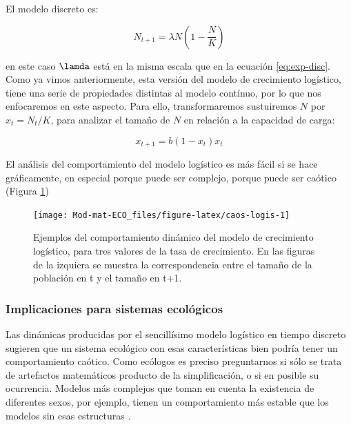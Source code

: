 \documentclass[
]{book}
\begin{document}
El modelo discreto es:

\begin{equation}
N_{t+1} = \lambda N \left (1 - \frac{N}{K} \right)
\end{equation}

en este caso \(\lamda\) está en la misma escala que en la ecuación \eqref{eq:exp-disc}. Como ya vimos anteriormente, esta versión del modelo de crecimiento logístico, tiene una serie de propiedades distintas al modelo contínuo, por lo que nos enfocaremos en este aspecto. Para ello, transformaremos sustuiremos \(N\) por \(x_t = N_t/K\), para analizar el tamaño de \(N\) en relación a la capacidad de carga:

\begin{equation}
x_{t+1} = b(1-x_t)x_t \label{eq:logis-disc}
\end{equation}

El análisis del comportamiento del modelo logístico es más fácil si se hace gráficamente, en especial porque puede ser complejo, porque puede ser caótico (Figura \ref{fig:caos-logis})

\begin{figure}

{\centering \texttt{[image: Mod-mat-ECO\_files/figure-latex/caos-logis-1]} 

}

\caption{Ejemplos del comportamiento dinámico del modelo de crecimiento logístico, para tres valores de la tasa de crecimiento. En las figuras de la izquiera se muestra la correspondencia entre el tamaño de la población en t y el tamaño en t+1.}\label{fig:caos-logis}
\end{figure}

\hypertarget{implicaciones-para-sistemas-ecoluxf3gicos}{%
\subsubsection{Implicaciones para sistemas ecológicos}\label{implicaciones-para-sistemas-ecoluxf3gicos}}

Las dinámicas producidas por el sencillísimo modelo logístico en tiempo discreto sugieren que un sistema ecológico con esas características bien podría tener un comportamiento caótico. Como ecólogos es preciso preguntarnos si sólo se trata de artefactos matemáticos producto de la simplificación, o si en posible su ocurrencia. Modelos más complejos que toman en cuenta la existencia de diferentes sexos, por ejemplo, tienen un comportamiento más estable que los modelos sin esas estructuras \citep[\citet{Scheuring2002IsCD}]{berryman1989ecological}.
\end{document}
